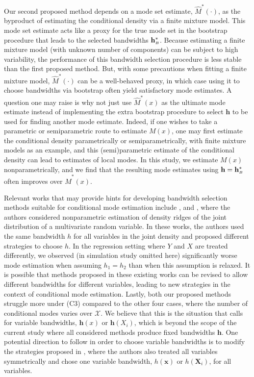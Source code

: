 \documentclass[fleqn,12pt,twoside]{article}
\newcommand{\bh}{\mathbf{h}}
\newcommand{\bx}{\mathbf{x}}
\newcommand{\bX}{\mathbf{X}}
\numberwithin{equation}{section}
\begin{document}
Our second proposed method depends on a mode set estimate, $\hat M^*(\cdot)$, as the byproduct of estimating the conditional density via a finite mixture model. This mode set estimate acts like a proxy for the true mode set in the bootstrap procedure that leads to the selected bandwidths $\bh^*_{\hbox {\tiny $B$}}$. Because estimating a finite mixture model (with unknown number of components) can be subject to high variability, the performance of this bandwidth selection procedure is less stable than the first proposed method. But, with some precautions when fitting a finite mixture model, $\hat M^*(\cdot)$ can be a well-behaved proxy, in which case using it to choose bandwidths via bootstrap often yield satisfactory mode estimates. A question one may raise is why not just use $\hat M^*(x)$ as the ultimate mode estimate instead of implementing the extra bootstrap procedure to select $\bh$ to be used for finding another mode estimate. Indeed, if one wishes to take a parametric or semiparametric route to estimate $M(x)$, one may first estimate the conditional density parametrically or semiparametrically, with finite mixture models as an example, and this (semi)parametric estimate of the conditional density can lead to estimates of local modes. In this study, we estimate $M(x)$ nonparametrically, and we find that the resulting mode estimates using $\bh=\bh^*_{\hbox {\tiny $B$}}$ often improves over $\hat M^*(x)$. 

Relevant works that may provide hints for developing bandwidth selection methods suitable for conditional mode estimation include \cite{chen2015optimal, genovese2016non}, and \cite{chen2016comprehensive}, where the authors considered nonparametric estimation of density ridges of the joint distribution of a multivariate random variable. In these works, the authors used the same bandwidth $h$ for all variables in the joint density and proposed different strategies to choose $h$. In the regression setting where $Y$ and $X$ are treated differently, we observed (in simulation study omitted here) significantly worse mode estimation when assuming $h_1=h_2$ than when this assumption is relaxed. It is possible that methods proposed in these existing works can be revised to allow different bandwidths for different variables, leading to new strategies in the context of conditional mode estimation. Lastly, both our proposed methods struggle more under (C3) compared to the other four cases, where the number of conditional modes varies over $\mathscr{X}$. We believe that this is the situation that calls for variable bandwidths, $\bh(x)$ or $\bh(X_i)$, which is beyond the scope of the current study where all considered methods produce fixed bandwidths $\bh$. One potential direction to follow in order to choose variable bandwidths is to modify the strategies proposed in \cite{comaniciu2001variable}, where the authors also treated all variables symmetrically and chose one variable bandwidth, $h(\bx)$ or $h(\bX_i)$, for all variables. 
\end{document}
